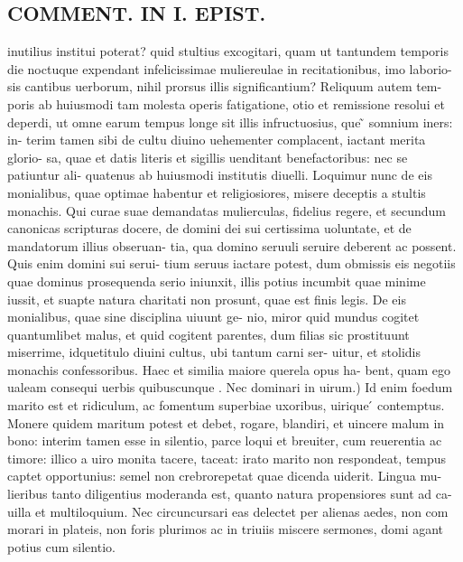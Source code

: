 \documentclass{article}
\begin{document}
\begin{pages}
\section*{COMMENT. IN I. EPIST. }
\marginpar{[ p.488 ]}\pstart inutilius institui poterat? quid stultius excogitari, quam ut tantundem temporis die noctuque  expendant infelicissimae muliereulae in recitationibus, imo laborio- sis cantibus uerborum, nihil prorsus illis significantium? Reliquum autem tem- poris ab huiusmodi tam molesta operis fatigatione, otio et remissione resolui et deperdi, ut omne earum tempus longe sit illis infructuosius, que ̃ somnium iners: in- terim tamen sibi de cultu diuino uehementer complacent, iactant merita glorio- sa, quae et datis literis et sigillis uenditant benefactoribus: nec se patiuntur ali- quatenus ab huiusmodi institutis diuelli. Loquimur nunc de eis monialibus, quae optimae habentur et religiosiores, misere deceptis a stultis monachis. Qui curae suae demandatas mulierculas, fidelius regere, et secundum canonicas scripturas docere, de domini dei sui certissima uoluntate, et de mandatorum illius obseruan- tia, qua domino seruuli seruire deberent ac possent. Quis enim domini sui serui- tium seruus iactare potest, dum obmissis eis negotiis quae dominus prosequenda serio iniunxit, illis potius incumbit quae minime iussit, et suapte natura charitati non prosunt, quae est finis legis. De eis monialibus, quae sine disciplina uiuunt ge- nio, miror quid mundus cogitet quantumlibet malus, et quid cogitent parentes, dum filias sic prostituunt miserrime, idquetitulo diuini cultus, ubi tantum carni ser- uitur, et stolidis monachis confessoribus. Haec et similia maiore querela opus ha- bent, quam ego ualeam consequi uerbis quibuscunque . Nec dominari in uirum.) Id enim foedum marito est et ridiculum, ac fomentum superbiae uxoribus, uirique ́ contemptus. Monere quidem maritum potest et debet, rogare, blandiri, et uincere malum in bono: interim tamen esse in silentio, parce loqui et breuiter, cum reuerentia ac timore: illico a uiro monita tacere, taceat: irato marito non respondeat, tempus captet opportunius: semel non crebrorepetat quae dicenda uiderit. Lingua mu- lieribus tanto diligentius moderanda est, quanto natura propensiores sunt ad ca- uilla et multiloquium. Nec circuncursari eas delectet per alienas aedes, non com morari in plateis, non foris plurimos ac in triuiis miscere sermones, domi agant potius cum silentio.  \pend
{}
{}

\end{pages}
\end{document}
